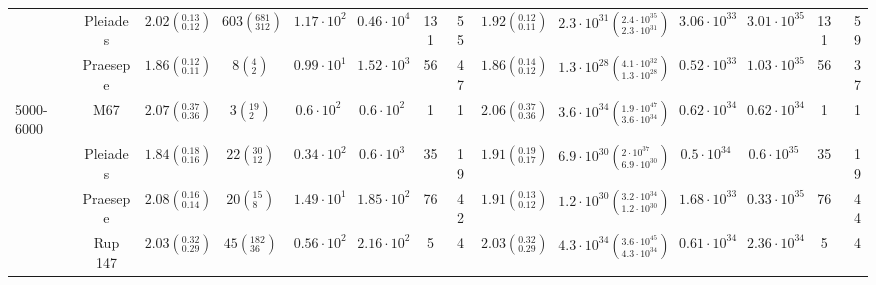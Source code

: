 \begin{tabular}{lccccccccccccr}
          & Pleiades &  $2.02\left(^{0.13}_{0.12}\right)$ &      $603\left(^{681}_{312}\right)$ &    $1.17\cdot 10^{2}$ &    $0.46\cdot 10^{4}$ &                 131 &                  55 &  $1.92\left(^{0.12}_{0.11}\right)$ &  $2.3 \cdot 10^{31}\left(^{2.4 \cdot 10^{35}}_{2.3 \cdot 10^{31}}\right)$ &       $3.06\cdot 10^{33}$ &       $3.01\cdot 10^{35}$ &                   131 &                    59 \\
          & Praesepe &  $1.86\left(^{0.12}_{0.11}\right)$ &            $8\left(^{4}_{2}\right)$ &    $0.99\cdot 10^{1}$ &    $1.52\cdot 10^{3}$ &                  56 &                  47 &  $1.86\left(^{0.14}_{0.12}\right)$ &  $1.3 \cdot 10^{28}\left(^{4.1 \cdot 10^{32}}_{1.3 \cdot 10^{28}}\right)$ &       $0.52\cdot 10^{33}$ &       $1.03\cdot 10^{35}$ &                    56 &                    37 \\
5000-6000 & M67 &  $2.07\left(^{0.37}_{0.36}\right)$ &           $3\left(^{19}_{2}\right)$ &     $0.6\cdot 10^{2}$ &     $0.6\cdot 10^{2}$ &                   1 &                   1 &  $2.06\left(^{0.37}_{0.36}\right)$ &  $3.6 \cdot 10^{34}\left(^{1.9 \cdot 10^{47}}_{3.6 \cdot 10^{34}}\right)$ &       $0.62\cdot 10^{34}$ &       $0.62\cdot 10^{34}$ &                     1 &                     1 \\
          & Pleiades &  $1.84\left(^{0.18}_{0.16}\right)$ &         $22\left(^{30}_{12}\right)$ &    $0.34\cdot 10^{2}$ &     $0.6\cdot 10^{3}$ &                  35 &                  19 &  $1.91\left(^{0.19}_{0.17}\right)$ &    $6.9 \cdot 10^{30}\left(^{2 \cdot 10^{37}}_{6.9 \cdot 10^{30}}\right)$ &        $0.5\cdot 10^{34}$ &        $0.6\cdot 10^{35}$ &                    35 &                    19 \\
          & Praesepe &  $2.08\left(^{0.16}_{0.14}\right)$ &          $20\left(^{15}_{8}\right)$ &    $1.49\cdot 10^{1}$ &    $1.85\cdot 10^{2}$ &                  76 &                  42 &  $1.91\left(^{0.13}_{0.12}\right)$ &  $1.2 \cdot 10^{30}\left(^{3.2 \cdot 10^{34}}_{1.2 \cdot 10^{30}}\right)$ &       $1.68\cdot 10^{33}$ &       $0.33\cdot 10^{35}$ &                    76 &                    44 \\
          & Rup 147 &  $2.03\left(^{0.32}_{0.29}\right)$ &        $45\left(^{182}_{36}\right)$ &    $0.56\cdot 10^{2}$ &    $2.16\cdot 10^{2}$ &                   5 &                   4 &  $2.03\left(^{0.32}_{0.29}\right)$ &  $4.3 \cdot 10^{34}\left(^{3.6 \cdot 10^{45}}_{4.3 \cdot 10^{34}}\right)$ &       $0.61\cdot 10^{34}$ &       $2.36\cdot 10^{34}$ &                     5 &                     4 \\
\hline

\end{tabular}
